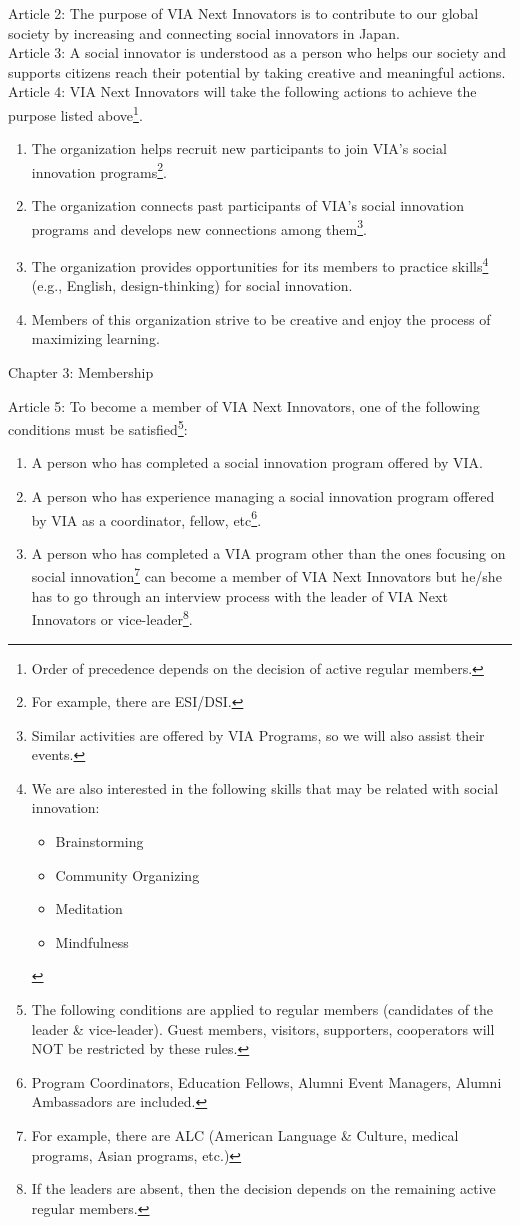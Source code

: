 \documentclass[dvipdfmx]{article}
\begin{document}
Article 2: The purpose of VIA Next Innovators is to contribute to our global society by increasing and connecting social innovators in Japan.\\
Article 3: A social innovator is understood as a person who helps our society and supports citizens reach their potential by taking creative and meaningful actions.\\
Article 4: VIA Next Innovators will take the following actions to achieve the purpose listed above\footnote{Order of precedence depends on the decision of active regular members.}.
\begin{enumerate}
\item The organization helps recruit new participants to join VIA’s social innovation programs\footnote{For example, there are ESI/DSI.}.
\item The organization connects past participants of VIA’s social innovation programs and develops new connections among them\footnote{Similar activities are offered by VIA Programs, so we will also assist their events.}.
\item The organization provides opportunities for its members to practice skills\footnote{We are also interested in the following skills that may be related with social innovation:
\begin{itemize}
\item Brainstorming\cite{ctb}
\item Community Organizing\cite{dev,build}
\item Meditation
\item Mindfulness\cite{art,psy}
\end{itemize}
} (e.g., English, design-thinking\cite{how,why,research}) for social innovation.
\item Members of this organization strive to be creative and enjoy the process of maximizing learning.
\end{enumerate}
\begin{center}
Chapter 3: Membership
\end{center}
Article 5: To become a member of VIA Next Innovators, one of the following conditions must be satisfied\footnote{The following conditions are applied to regular members (candidates of the leader \& vice-leader). Guest members, visitors, supporters, cooperators will NOT be restricted by these rules.}:
\begin{enumerate}
\item A person who has completed a social innovation program offered by VIA.
\item A person who has experience managing a social innovation program offered by VIA as a coordinator, fellow, etc\footnote{Program Coordinators, Education Fellows, Alumni Event Managers, Alumni Ambassadors are included.}.
\item A person who has completed a VIA program other than the ones focusing on social innovation\footnote{For example, there are ALC (American Language \& Culture, medical programs, Asian programs, etc.)} can become a member of VIA Next Innovators but he/she has to go through an interview process with the leader of VIA Next Innovators or vice-leader\footnote{If the leaders are absent, then the decision depends on the remaining active regular members.}.
\end{enumerate}
\end{document}

